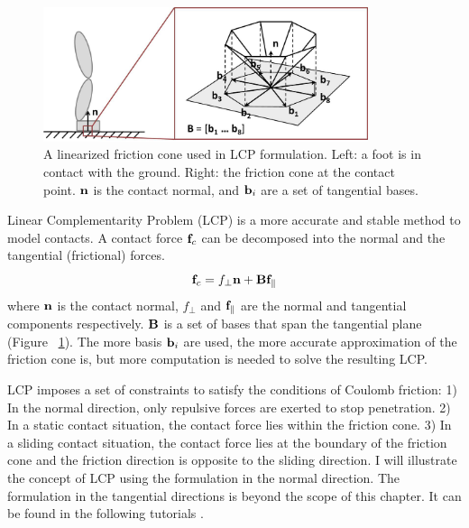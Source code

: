 \begin{figure}[h]
  \centering
  \includegraphics[width=0.85\textwidth]{figures/contact.jpg}
  \caption{A linearized friction cone used in LCP formulation. Left: a foot is in contact with the ground. Right: the friction cone at the contact point. $\mathbf{n}$ is the contact normal, and $\mathbf{b}_i$ are a set of tangential bases.}
  \label{fig:contactCone}
\end{figure}

Linear Complementarity Problem (LCP) is a more accurate and stable method to model contacts. A contact force $\mathbf{f}_c$ can be decomposed into the normal and the tangential (frictional) forces.
\begin{displaymath}
\mathbf{f}_c = f_\perp\mathbf{n}+\mathbf{B}\mathbf{f}_{\parallel}
\end{displaymath}
where $\mathbf{n}$ is the contact normal, $f_\perp$ and $\mathbf{f}_{\parallel}$ are the normal and tangential components respectively. $\mathbf{B}$ is a set of bases that span the tangential plane (Figure ~\ref{fig:contactCone}). The more basis $\mathbf{b}_i$ are used, the more accurate approximation of the friction cone is, but more computation is needed to solve the resulting LCP. 

LCP imposes a set of constraints to satisfy the conditions of Coulomb friction: 1) In the normal direction, only repulsive forces are exerted to stop penetration. 2) In a static contact situation, the contact force lies within the friction cone. 3) In a sliding contact situation, the contact force lies at the boundary of the friction cone and the friction direction is opposite to the sliding direction. I will illustrate the concept of LCP using the formulation in the normal direction. The formulation in the tangential directions is beyond the scope of this chapter. It can be found in the following tutorials \cite{Lloyd:2005,Tan:2012b}. 

